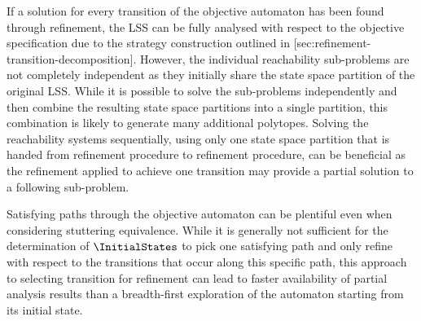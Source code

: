 \stopsubsection


\startsubsection[title={Transition Selection},reference=refinement-transition-selection]

    If a solution for every transition of the objective automaton has been found through refinement, the LSS can be fully analysed with respect to the objective specification due to the strategy construction outlined in [sec:refinement-transition-decomposition].
    However, the individual reachability sub-problems are not completely independent as they initially share the state space partition of the original LSS.
    While it is possible to solve the sub-problems independently and then combine the resulting state space partitions into a single partition, this combination is likely to generate many additional polytopes.
    Solving the reachability systems sequentially, using only one state space partition that is handed from refinement procedure to refinement procedure, can be beneficial as the refinement applied to achieve one transition may provide a partial solution to a following sub-problem.

    Satisfying paths through the objective automaton can be plentiful even when considering stuttering equivalence.
    While it is generally not sufficient for the determination of $\InitialStates$ to pick one satisfying path and only refine with respect to the transitions that occur along this specific path, this approach to selecting transition for refinement can lead to faster availability of partial analysis results than a breadth-first exploration of the automaton starting from its initial state.

\stopsubsection

